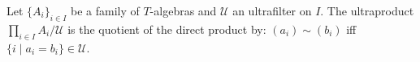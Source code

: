 Let $\{A_i\}_{i \in I}$ be a family of $T$-algebras and $\mathcal{U}$ an ultrafilter on $I$. The ultraproduct $\prod_{i \in I} A_i / \mathcal{U}$ is the quotient of the direct product by: $(a_i) \sim (b_i)$ iff $\{i \mid a_i = b_i\} \in \mathcal{U}$.
